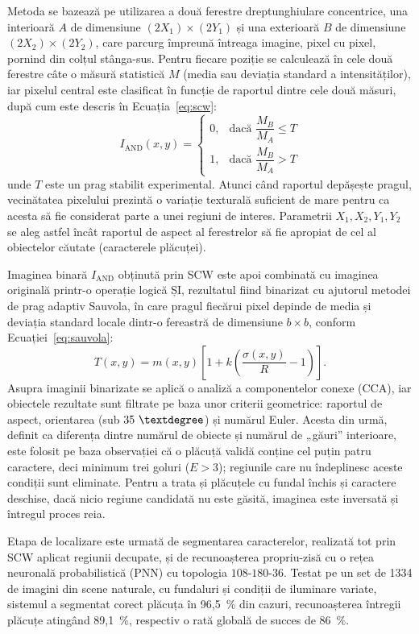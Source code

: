 Metoda se bazează pe utilizarea a două ferestre dreptunghiulare concentrice, una interioară $A$ de dimensiune $(2X_1) \times (2Y_1)$ și una exterioară $B$ de dimensiune $(2X_2) \times (2Y_2)$, care parcurg împreună întreaga imagine, pixel cu pixel, pornind din colțul stânga-sus. Pentru fiecare poziție se calculează în cele două ferestre câte o măsură statistică $M$ (media sau deviația standard a intensităților), iar pixelul central este clasificat în funcție de raportul dintre cele două măsuri, după cum este descris în Ecuația~\ref{eq:scw}:
\begin{equation}
  I_{\text{AND}}(x, y) = \begin{cases} 0, & \text{dacă } \dfrac{M_B}{M_A} \leq T \\[2mm] 1, & \text{dacă } \dfrac{M_B}{M_A} > T \end{cases}
  \label{eq:scw}
\end{equation}
unde $T$ este un prag stabilit experimental. Atunci când raportul depășește pragul, vecinătatea pixelului prezintă o variație texturală suficient de mare pentru ca acesta să fie considerat parte a unei regiuni de interes. Parametrii $X_1, X_2, Y_1, Y_2$ se aleg astfel încât raportul de aspect al ferestrelor să fie apropiat de cel al obiectelor căutate (caracterele plăcuței).

Imaginea binară $I_{\text{AND}}$ obținută prin SCW este apoi combinată cu imaginea originală printr-o operație logică ȘI, rezultatul fiind binarizat cu ajutorul metodei de prag adaptiv Sauvola, în care pragul fiecărui pixel depinde de media și deviația standard locale dintr-o fereastră de dimensiune $b \times b$, conform Ecuației~\ref{eq:sauvola}:
\begin{equation}
  T(x, y) = m(x, y)\left[1 + k\left(\frac{\sigma(x, y)}{R} - 1\right)\right].
  \label{eq:sauvola}
\end{equation}
Asupra imaginii binarizate se aplică o analiză a componentelor conexe (CCA), iar obiectele rezultate sunt filtrate pe baza unor criterii geometrice: raportul de aspect, orientarea (sub $35~\textdegree$) și numărul Euler. Acesta din urmă, definit ca diferența dintre numărul de obiecte și numărul de „găuri'' interioare, este folosit pe baza observației că o plăcuță validă conține cel puțin patru caractere, deci minimum trei goluri ($E > 3$); regiunile care nu îndeplinesc aceste condiții sunt eliminate. Pentru a trata și plăcuțele cu fundal închis și caractere deschise, dacă nicio regiune candidată nu este găsită, imaginea este inversată și întregul proces reia.

Etapa de localizare este urmată de segmentarea caracterelor, realizată tot prin SCW aplicat regiunii decupate, și de recunoașterea propriu-zisă cu o rețea neuronală probabilistică (PNN) cu topologia $108\text{-}180\text{-}36$. Testat pe un set de 1334 de imagini din scene naturale, cu fundaluri și condiții de iluminare variate, sistemul a segmentat corect plăcuța în 96,5~\% din cazuri, recunoașterea întregii plăcuțe atingând 89,1~\%, respectiv o rată globală de succes de 86~\%.
